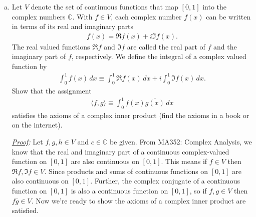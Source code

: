 \documentclass[11pt]{article}
\begin{document}
\begin{enumerate}[(a)]
	\item Let $V$ denote the set of continuous functions that map $[0,1]$ into the complex numbers $\mathbb{C}$. With $f\in V$, each complex number $f(x)$ can be written in terms of its real and imaginary parts
	\begin{align*}
	f(x) = \Re{f(x)} + i\Im{f(x)}.
	\end{align*}
	The real valued functions $\Re{f}$ and $\Im{f}$ are called the real part of $f$ and the imaginary part of $f$, respectively. We define the integral of a complex valued function by 
	\begin{align*}
	\int^1_0 f(x)\,dx \equiv \int^1_0 \Re{f(x)}\,dx + i\int^1_0\Im{f(x)}\,dx.
	\end{align*}
	Show that the assignment 
	\begin{align*}
	\langle f,g \rangle \equiv \int^1_0 f(x)\overline{g(x)}\,dx
	\end{align*}
	satisfies the axioms of a complex inner product (find the axioms in a book or on the internet).
	
	
	
	
	
	
	
	
	\noindent \textit{\underline{Proof}:} Let $f,g,h\in V$ and $c\in \mathbb{C}$ be given. From MA352: Complex Analysis, we know that the real and imaginary part of a continuous complex-valued function on $[0,1]$ are also continuous on $[0,1]$. This means if $f\in V$ then $\Re{f}, \Im{f} \in V$. Since products and sums of continuous functions on $[0,1]$ are also continuous on $[0,1]$. Further, the complex conjugate of a continuous function on $[0,1]$ is also a continuous function on $[0,1]$, so if $f,g\in V$ then $f\overline{g}\in V$. Now we're ready to show the axioms of a  complex inner product are satisfied. 
	

\end{enumerate}
\end{document}
